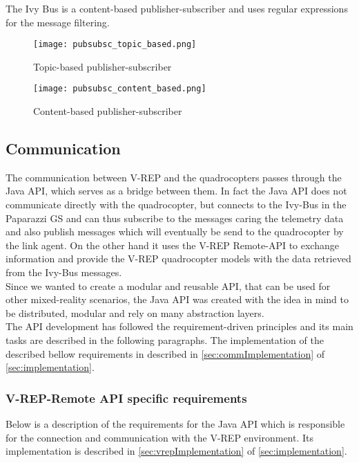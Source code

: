 The Ivy Bus is a content-based publisher-subscriber and uses regular expressions for the message filtering.

\begin{figure}[!tbp]
  \centering
  \begin{minipage}[b]{0.4\textwidth}
    \texttt{[image: pubsubsc\_topic\_based.png]}
    \caption{Topic-based publisher-subscriber \label{fig:pubsubsc_content_based}}
  \end{minipage}
  \hfill
  \begin{minipage}[b]{0.4\textwidth}
    \texttt{[image: pubsubsc\_content\_based.png]}
    \caption{Content-based publisher-subscriber \label{fig:pubsubsc_topic_based}}
  \end{minipage}
\end{figure}

\subsection{Communication}
\label{sec:communication}

The communication between V-REP and the quadrocopters passes through the Java API, which serves as a bridge between them. In fact the Java API does not communicate directly with the quadrocopter, but connects to the Ivy-Bus in the Paparazzi GS and can thus subscribe to the messages caring the telemetry data and also publish messages which will eventually be send to the quadrocopter by the link agent. On the other hand it uses the V-REP Remote-API to exchange information and provide the V-REP quadrocopter models with the data retrieved from the Ivy-Bus messages.\\ 
Since we wanted to create a modular and reusable API, that can be used for other mixed-reality scenarios, the Java API was created with the idea in mind to be distributed, modular and rely on many abstraction layers.\\ 
The API development has followed the requirement-driven principles and its main tasks are described in the following paragraphs. The implementation of the described bellow requirements in described in \ref{sec:commImplementation} of \ref{sec:implementation}.

\subsubsection{V-REP-Remote API specific requirements}
\label{sec:requirementsVREP}

Below is a description of the requirements for the Java API which is responsible for the connection and communication with the V-REP environment. Its implementation is described in \ref{sec:vrepImplementation} of \ref{sec:implementation}.

